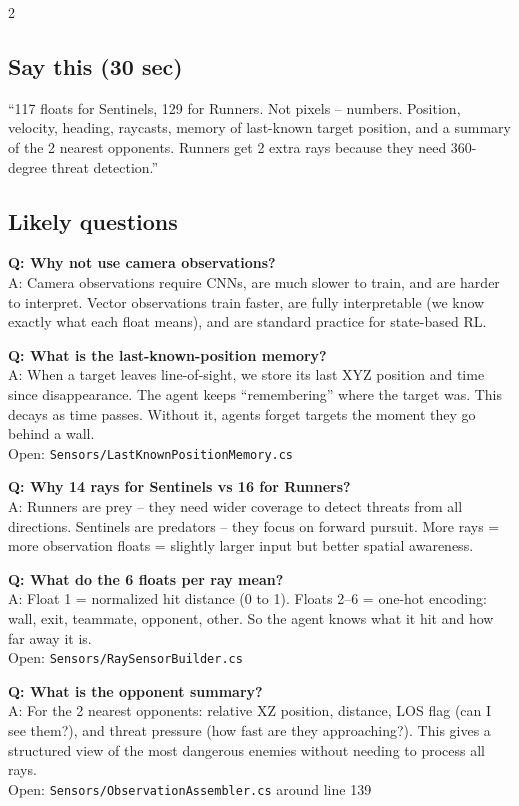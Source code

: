 \documentclass[9pt,a4paper]{article}
\begin{document}
\begin{multicols}{2}
\subsection{Say this (30 sec)}
``117 floats for Sentinels, 129 for Runners. Not pixels -- numbers. Position, velocity, heading, raycasts, memory of last-known target position, and a summary of the 2 nearest opponents. Runners get 2 extra rays because they need 360-degree threat detection.''

\subsection{Likely questions}
\textbf{Q: Why not use camera observations?} \\
A: Camera observations require CNNs, are much slower to train, and are harder to interpret. Vector observations train faster, are fully interpretable (we know exactly what each float means), and are standard practice for state-based RL.

\textbf{Q: What is the last-known-position memory?} \\
A: When a target leaves line-of-sight, we store its last XYZ position and time since disappearance. The agent keeps ``remembering'' where the target was. This decays as time passes. Without it, agents forget targets the moment they go behind a wall. \\
{\scriptsize\color{gray} Open: \texttt{Sensors/LastKnownPositionMemory.cs}}

\textbf{Q: Why 14 rays for Sentinels vs 16 for Runners?} \\
A: Runners are prey -- they need wider coverage to detect threats from all directions. Sentinels are predators -- they focus on forward pursuit. More rays = more observation floats = slightly larger input but better spatial awareness.

\textbf{Q: What do the 6 floats per ray mean?} \\
A: Float 1 = normalized hit distance (0 to 1). Floats 2--6 = one-hot encoding: wall, exit, teammate, opponent, other. So the agent knows what it hit and how far away it is. \\
{\scriptsize\color{gray} Open: \texttt{Sensors/RaySensorBuilder.cs}}

\textbf{Q: What is the opponent summary?} \\
A: For the 2 nearest opponents: relative XZ position, distance, LOS flag (can I see them?), and threat pressure (how fast are they approaching?). This gives a structured view of the most dangerous enemies without needing to process all rays. \\
{\scriptsize\color{gray} Open: \texttt{Sensors/ObservationAssembler.cs} around line 139}


\end{multicols}
\end{document}
